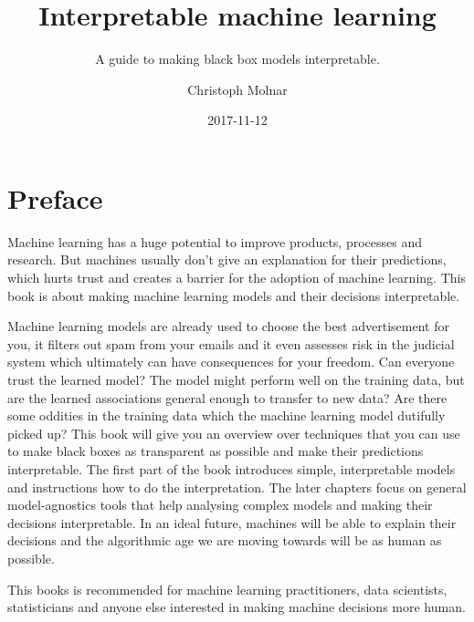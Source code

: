 \documentclass[12pt,]{krantz}
\title{Interpretable machine learning}
\subtitle{A guide to making black box models interpretable.}
\author{Christoph Molnar}
\date{2017-11-12}
\theoremstyle{definition}
\theoremstyle{definition}
\theoremstyle{definition}
\theoremstyle{remark}
\begin{document}
\maketitle



\setlength{\abovedisplayskip}{-5pt}
\setlength{\abovedisplayshortskip}{-5pt}

{
\hypersetup{linkcolor=black}
\setcounter{tocdepth}{1}
\tableofcontents
}
\chapter*{Preface}\label{preface}

Machine learning has a huge potential to improve products, processes and
research. But machines usually don't give an explanation for their
predictions, which hurts trust and creates a barrier for the adoption of
machine learning. This book is about making machine learning models and
their decisions interpretable.

Machine learning models are already used to choose the best
advertisement for you, it filters out spam from your emails and it even
assesses risk in the judicial system which ultimately can have
consequences for your freedom. Can everyone trust the learned model? The
model might perform well on the training data, but are the learned
associations general enough to transfer to new data? Are there some
oddities in the training data which the machine learning model dutifully
picked up? This book will give you an overview over techniques that you
can use to make black boxes as transparent as possible and make their
predictions interpretable. The first part of the book introduces simple,
interpretable models and instructions how to do the interpretation. The
later chapters focus on general model-agnostics tools that help
analysing complex models and making their decisions interpretable. In an
ideal future, machines will be able to explain their decisions and the
algorithmic age we are moving towards will be as human as possible.

This books is recommended for machine learning practitioners, data
scientists, statisticians and anyone else interested in making machine
decisions more human.
\end{document}
